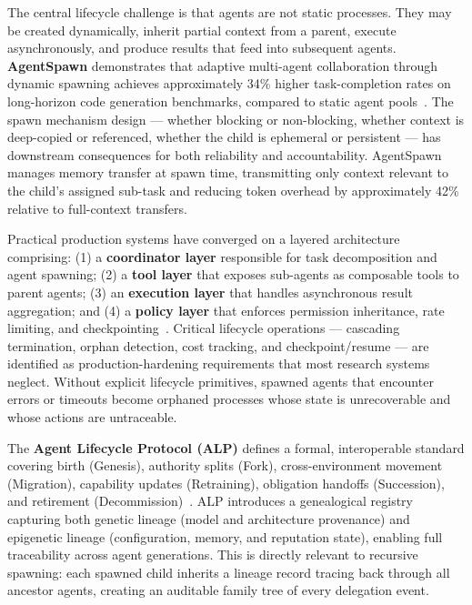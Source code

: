 The central lifecycle challenge is that agents are not static processes. They may be created dynamically, inherit partial context from a parent, execute asynchronously, and produce results that feed into subsequent agents. \textbf{AgentSpawn} demonstrates that adaptive multi-agent collaboration through dynamic spawning achieves approximately 34\% higher task-completion rates on long-horizon code generation benchmarks, compared to static agent pools~\cite{agentspawn2026}. The spawn mechanism design — whether blocking or non-blocking, whether context is deep-copied or referenced, whether the child is ephemeral or persistent — has downstream consequences for both reliability and accountability. AgentSpawn manages memory transfer at spawn time, transmitting only context relevant to the child's assigned sub-task and reducing token overhead by approximately 42\% relative to full-context transfers.

Practical production systems have converged on a layered architecture comprising: (1) a \textbf{coordinator layer} responsible for task decomposition and agent spawning; (2) a \textbf{tool layer} that exposes sub-agents as composable tools to parent agents; (3) an \textbf{execution layer} that handles asynchronous result aggregation; and (4) a \textbf{policy layer} that enforces permission inheritance, rate limiting, and checkpointing~\cite{rde2024}. Critical lifecycle operations — cascading termination, orphan detection, cost tracking, and checkpoint/resume — are identified as production-hardening requirements that most research systems neglect. Without explicit lifecycle primitives, spawned agents that encounter errors or timeouts become orphaned processes whose state is unrecoverable and whose actions are untraceable.

The \textbf{Agent Lifecycle Protocol (ALP)} defines a formal, interoperable standard covering birth (Genesis), authority splits (Fork), cross-environment movement (Migration), capability updates (Retraining), obligation handoffs (Succession), and retirement (Decommission)~\cite{wooldridge1995,stone2000,ferber1996,padgham2001}. ALP introduces a genealogical registry capturing both genetic lineage (model and architecture provenance) and epigenetic lineage (configuration, memory, and reputation state), enabling full traceability across agent generations. This is directly relevant to recursive spawning: each spawned child inherits a lineage record tracing back through all ancestor agents, creating an auditable family tree of every delegation event.

